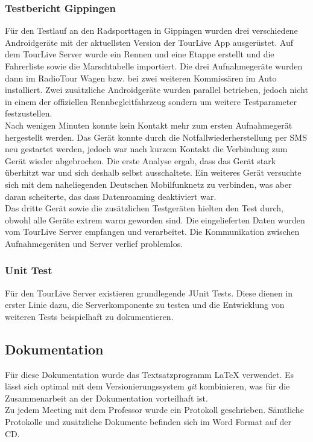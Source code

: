 \subsubsection{Testbericht Gippingen}
\label{sec:testberichtgippingen}
Für den Testlauf an den Radsporttagen in Gippingen wurden drei verschiedene Androidgeräte mit der aktuellsten Version der TourLive App ausgerüstet. Auf dem TourLive Server wurde ein Rennen und eine Etappe erstellt und die Fahrerliste sowie die Marschtabelle importiert. Die drei Aufnahmegeräte wurden dann im RadioTour Wagen bzw. bei zwei weiteren Kommissären im Auto installiert. Zwei zusätzliche Androidgeräte wurden parallel betrieben, jedoch nicht in einem der offiziellen Rennbegleitfahrzeug sondern um weitere Testparameter festzustellen.
\\

Nach wenigen Minuten konnte kein Kontakt mehr zum ersten Aufnahmegerät hergestellt werden. Das Gerät konnte durch die Notfallwiederherstellung per SMS neu gestartet werden, jedoch war nach kurzem Kontakt die Verbindung zum Gerät wieder abgebrochen. Die erste Analyse ergab, dass das Gerät stark überhitzt war und sich deshalb selbst ausschaltete. Ein weiteres Gerät versuchte sich mit dem naheliegenden Deutschen Mobilfunknetz zu verbinden, was aber daran scheiterte, das dass Datenroaming deaktiviert war.
\\

Das dritte Gerät sowie die zusätzlichen Testgeräten hielten den Test durch, obwohl alle Geräte extrem warm geworden sind. Die eingelieferten Daten wurden vom TourLive Server empfangen und verarbeitet. Die Kommunikation zwischen Aufnahmegeräten und Server verlief problemlos.

\subsubsection{Unit Test}
Für den TourLive Server existieren grundlegende JUnit Tests. Diese dienen in erster Linie dazu, die Serverkomponente zu testen und die Entwicklung von weiteren Tests beispielhaft zu dokumentieren.

\subsection{Dokumentation}
Für diese Dokumentation wurde das Textsatzprogramm {\LaTeX} verwendet. Es lässt sich optimal mit dem Versionierungssystem \textit{\gls{git}} kombinieren, was für die Zusammenarbeit an der Dokumentation vorteilhaft ist.
\\

Zu jedem Meeting mit dem Professor wurde ein Protokoll geschrieben. Sämtliche Protokolle und zusätzliche Dokumente befinden sich im Word Format auf der CD.